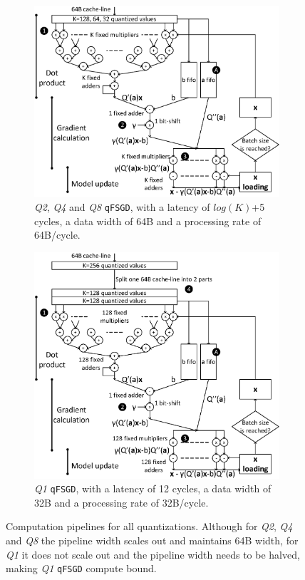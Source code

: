 \documentclass{article}
\begin{document}
\begin{figure}[t]
\centering
\begin{subfigure}[t]{.8\columnwidth}
\centering
\includegraphics[width=\columnwidth]{Figures/qFPGASGD.eps}
\caption{\textit{Q2}, \textit{Q4} and \textit{Q8} \texttt{qFSGD}, with a latency of $log(K)$+5 cycles, a data width of 64B and a processing rate of 64B/cycle.}
\label{fig:qFPGASGD}
\end{subfigure}
\quad
\begin{subfigure}[t]{.8\columnwidth}
\centering
\includegraphics[width=\columnwidth]{Figures/q1FPGASGD.eps}
\caption{\textit{Q1} \texttt{qFSGD}, with a latency of 12 cycles, a data width of 32B and a processing rate of 32B/cycle.}
\label{fig:q1FPGASGD}
\end{subfigure}
\caption{Computation pipelines for all quantizations. Although for \textit{Q2}, \textit{Q4} and \textit{Q8} the pipeline width scales out and maintains 64B width, for \textit{Q1} it does not scale out and the pipeline width needs to be halved, making \textit{Q1} \texttt{qFSGD} compute bound.}
\label{fig:qallFPGASGD}
\vspace{-1em}
\end{figure}
\end{document}
